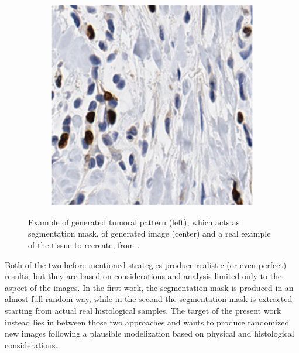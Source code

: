 \begin{figure}[t]
\begin{subfigure}[t]{0.3\textwidth}
             \caption{}
             \label{fig:cgan_model}
        \end{subfigure}
        \quad
        \begin{subfigure}[t]{0.3\textwidth}
             \centering
             \includegraphics[width = \textwidth]{images/cgan_real}
             \caption{}
             \label{fig:cgan_real}
        \end{subfigure}
        \caption{Example of generated tumoral pattern (left), which acts as segmentation mask, of generated image (center) and a real example of the tissue to recreate, from \cite{Senaras2018}.}
        \label{fig:cgan_tripl}
    \end{figure}


Both of the two before-mentioned strategies produce realistic (or even perfect) results, but they are based on considerations and analysis limited only to the aspect of the images. In the first work, the segmentation mask is produced in an almost full-random way, while in the second the segmentation mask is extracted starting from actual real histological samples. The target of the present work instead lies in between those two approaches and wants to produce randomized new images following a plausible modelization based on physical and histological considerations.

